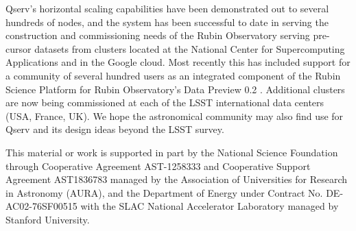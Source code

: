 \documentclass[11pt,twoside]{article}
\begin{document}
Qserv's horizontal scaling capabilities have been demonstrated out to several hundreds of nodes, and the
system has been successful to date in serving the construction and commissioning needs of the Rubin
Observatory serving pre-cursor datasets from clusters located at the National Center for Supercomputing
Applications and in the Google cloud.  Most recently this has included support for a community of several
hundred users as an integrated component of the Rubin Science Platform for Rubin Observatory's Data Preview
0.2 \citep{RTN-041}. Additional clusters are now being commissioned at each of the LSST international data
centers (USA, France, UK).  We hope the astronomical community may also find use for Qserv and its design
ideas beyond the LSST survey.

\acknowledgements This material or work is supported in part by the National Science Foundation through
Cooperative Agreement AST-1258333 and Cooperative Support Agreement AST1836783 managed by the Association of
Universities for Research in Astronomy (AURA), and the Department of Energy under Contract No.
DE-AC02-76SF00515 with the SLAC National Accelerator Laboratory managed by Stanford University.


\end{document}
